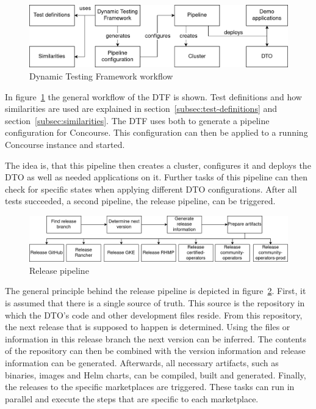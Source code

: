 \begin{figure}[H]
    \centering
    \includegraphics[width=\textwidth]{img/context/dtf}
    \caption{Dynamic Testing Framework workflow}
    \label{fig:dtf-workflow}
\end{figure}

In figure~\ref{fig:dtf-workflow} the general workflow of the DTF is shown.
Test definitions and how similarities are used are explained in section~\ref{subsec:test-definitions} and section~\ref{subsec:similarities}.
The DTF uses both to generate a pipeline configuration for Concourse.
This configuration can then be applied to a running Concourse instance and started.

The idea is, that this pipeline then creates a cluster, configures it and deploys the DTO as well as needed applications on it.
Further tasks of this pipeline can then check for specific states when applying different DTO configurations.
After all tests succeeded, a second pipeline, the release pipeline, can be triggered.

\begin{figure}[H]
    \centering
    \includegraphics[width=\textwidth]{img/context/release pipeline}
    \caption{Release pipeline}
    \label{fig:release-pipeline}
\end{figure}

The general principle behind the release pipeline is depicted in figure~\ref{fig:release-pipeline}.
First, it is assumed that there is a single source of truth.
This source is the repository in which the DTO's code and other development files reside.
From this repository, the next release that is supposed to happen is determined.
Using the files or information in this release branch the next version can be inferred.
The contents of the repository can then be combined with the version information and release information can be generated.
Afterwards, all necessary artifacts, such as binaries, images and Helm charts, can be compiled, built and generated.
Finally, the releases to the specific marketplaces are triggered.
These tasks can run in parallel and execute the steps that are specific to each marketplace.

